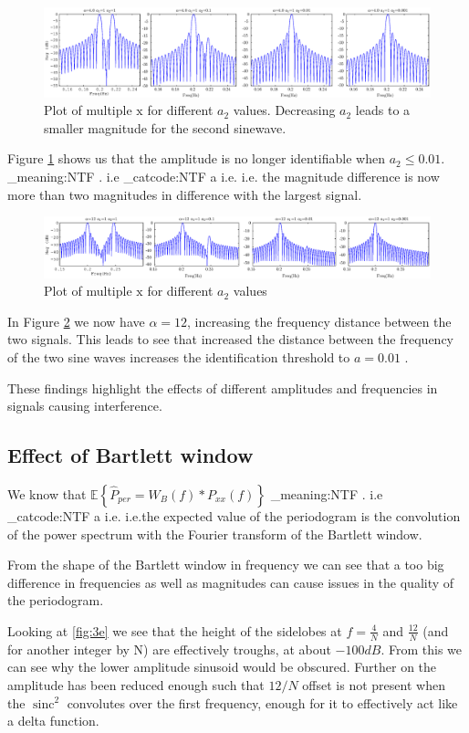 \documentclass[10pt,twoside,a4paper]{report}
\makeatletter
\DeclareMathOperator{\sinc}{sinc}
\newcommand\latinabbrev[1]{
  \peek_meaning:NTF . {%
    #1\@}%
  { \peek_catcode:NTF a {%
      #1.\@ }%
    {#1.\@}}}
\makeatother
\begin{document}
\begin{figure}[h!]
\centering
\includegraphics[width=\textwidth]{cw1im/3d.eps}
\caption{Plot of multiple $\boldsymbol{\mathrm{x}}$ for different $a_2$ values. Decreasing $a_2$ leads to a smaller magnitude for the second sinewave.}
\label{fig:3d}
\end{figure}
Figure \ref{fig:3d} shows us that the amplitude is no longer identifiable when $a_2 \leq 0.01$. \latinabbrev{i.e} the magnitude difference is now more than two magnitudes in difference with the largest signal.
\begin{figure}[h!]
\centering
\includegraphics[width=\textwidth]{cw1im/3d12.eps}
\caption{Plot of multiple $\boldsymbol{\mathrm{x}}$ for different $a_2$ values}
\label{fig:3d12}
\end{figure}

In Figure \ref{fig:3d12} we now have $\alpha=12$, increasing the frequency distance between the two signals. This leads to see that increased the distance between the frequency of the two sine waves increases the identification threshold to $a=0.01$ .

These findings highlight the effects of different amplitudes and frequencies in signals causing interference.

\subsection{Effect of Bartlett window}
We know that $\mathbb{E} \left\{ \hat{P}_{per} = W_B(f) \ast P_{xx}(f) \right\}$ \latinabbrev{i.e}the expected value of the periodogram is the convolution of the power spectrum with the Fourier transform of the Bartlett window.

From the shape of the Bartlett window in frequency we can see that a too big difference in frequencies as well as magnitudes can cause issues in the quality of the periodogram.

Looking at \ref{fig:3e}  we see that the height of the sidelobes at $f=\frac{4}{N}$ and $\frac{12}{N}$ (and for another integer by N) are effectively troughs, at about $-100dB$. From this we can see why the lower amplitude sinusoid would be obscured. Further on the amplitude has been reduced enough such that $12/N$ offset is not present when the $\sinc^2$ convolutes over the first frequency, enough for it to effectively act like a delta function.
\end{document}
